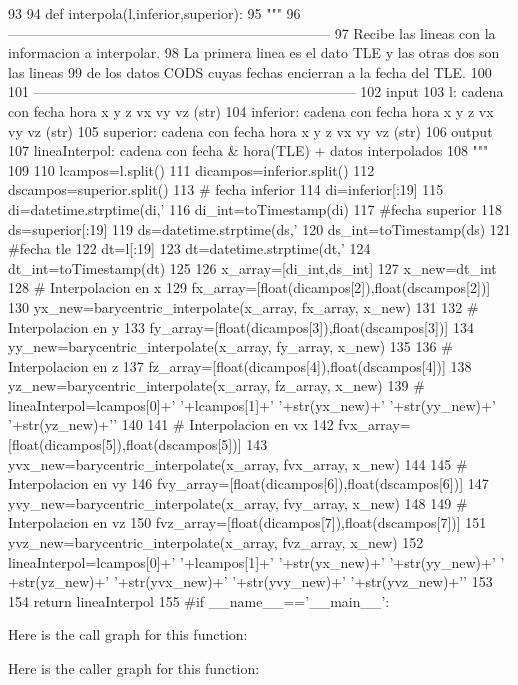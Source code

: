 \begin{DoxyCode}
93 
94 def interpola(l,inferior,superior):
95     """
96     ---------------------------------------------------------------------
97     Recibe las lineas con la informacion a interpolar.
98     La primera linea es el dato TLE y las otras dos son las lineas
99     de los datos CODS cuyas fechas encierran a la fecha del TLE.
100 
101     ---------------------------------------------------------------------
102     input
103         l: cadena con fecha hora x y z vx vy vz (str)
104         inferior: cadena con fecha hora x y z vx vy vz (str)
105         superior: cadena con fecha hora x y z vx vy vz (str)
106     output
107         lineaInterpol: cadena con fecha & hora(TLE) + datos interpolados 
108     """
109 
110     lcampos=l.split()
111     dicampos=inferior.split()
112     dscampos=superior.split()
113     # fecha inferior
114     di=inferior[:19]
115     di=datetime.strptime(di,'%
116     di_int=toTimestamp(di)
117     #fecha superior
118     ds=superior[:19]
119     ds=datetime.strptime(ds,'%
120     ds_int=toTimestamp(ds)
121     #fecha tle
122     dt=l[:19]
123     dt=datetime.strptime(dt,'%
124     dt_int=toTimestamp(dt)
125     
126     x_array=[di_int,ds_int]
127     x_new=dt_int
128     # Interpolacion en x
129     fx_array=[float(dicampos[2]),float(dscampos[2])]
130     yx_new=barycentric_interpolate(x_array, fx_array, x_new)
131 
132     # Interpolacion en y
133     fy_array=[float(dicampos[3]),float(dscampos[3])]
134     yy_new=barycentric_interpolate(x_array, fy_array, x_new)
135     
136     # Interpolacion en z
137     fz_array=[float(dicampos[4]),float(dscampos[4])]
138     yz_new=barycentric_interpolate(x_array, fz_array, x_new)
139 #    lineaInterpol=lcampos[0]+' '+lcampos[1]+' '+str(yx_new)+' '+str(yy_new)+'
       '+str(yz_new)+'\n'
140     
141     # Interpolacion en vx
142     fvx_array=[float(dicampos[5]),float(dscampos[5])]
143     yvx_new=barycentric_interpolate(x_array, fvx_array, x_new)
144  
145     # Interpolacion en vy
146     fvy_array=[float(dicampos[6]),float(dscampos[6])]
147     yvy_new=barycentric_interpolate(x_array, fvy_array, x_new)
148      
149     # Interpolacion en vz
150     fvz_array=[float(dicampos[7]),float(dscampos[7])]
151     yvz_new=barycentric_interpolate(x_array, fvz_array, x_new)
152     lineaInterpol=lcampos[0]+' '+lcampos[1]+' '+str(yx_new)+' '+str(yy_new)+' '
      +str(yz_new)+' '+str(yvx_new)+' '+str(yvy_new)+' '+str(yvz_new)+'\n'
153     
154     return lineaInterpol
155  
#if __name__=='__main__':   
\end{DoxyCode}


\-Here is the call graph for this function\-:




\-Here is the caller graph for this function\-:


